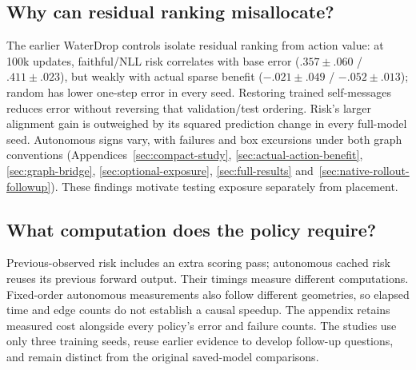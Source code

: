 \subsection{Why can residual ranking misallocate?}
The earlier WaterDrop controls isolate residual ranking from action value: at 100k updates, faithful/NLL risk correlates with base error ($.357\pm.060$ / $.411\pm.023$), but weakly with actual sparse benefit ($-.021\pm.049$ / $-.052\pm.013$); random has lower one-step error in every seed. Restoring trained self-messages reduces error without reversing that validation/test ordering. Risk's larger alignment gain is outweighed by its squared prediction change in every full-model seed. Autonomous signs vary, with failures and box excursions under both graph conventions (Appendices~\ref{sec:compact-study}, \ref{sec:actual-action-benefit}, \ref{sec:graph-bridge}, \ref{sec:optional-exposure}, \ref{sec:full-results} and~\ref{sec:native-rollout-followup}). These findings motivate testing exposure separately from placement.

\subsection{What computation does the policy require?}
Previous-observed risk includes an extra scoring pass; autonomous cached risk reuses its previous forward output. Their timings measure different computations. Fixed-order autonomous measurements also follow different geometries, so elapsed time and edge counts do not establish a causal speedup. The appendix retains measured cost alongside every policy's error and failure counts. The studies use only three training seeds, reuse earlier evidence to develop follow-up questions, and remain distinct from the original saved-model comparisons.
